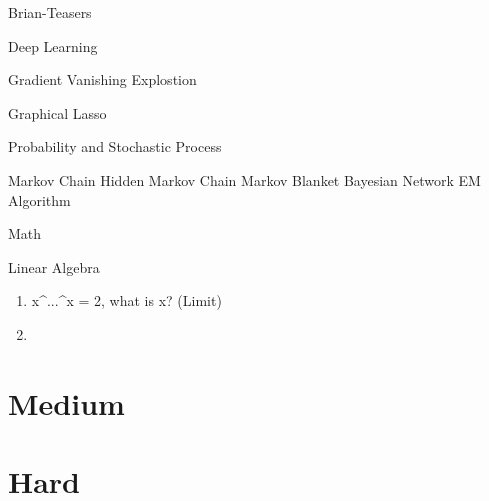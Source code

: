 \documentclass[11pt, openany]{book}              %
\begin{document}
Brian-Teasers

Deep Learning

Gradient Vanishing Explostion 


Graphical Lasso 

Probability and Stochastic Process 

Markov Chain
Hidden Markov Chain
Markov Blanket
Bayesian Network
EM Algorithm

Math

Linear Algebra

\begin{enumerate}
	\item x^...^x = 2, what is x? (Limit)
	\item 
\end{enumerate}


\section{Medium}
\section{Hard}



 
\end{document}

